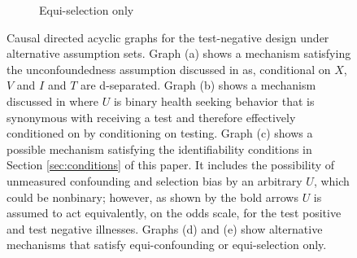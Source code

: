 \documentclass[11pt]{article}
\begin{document}
\begin{figure}[p]
\begin{subfigure}{0.49\linewidth}
        \caption{Equi-selection only}
        \end{subfigure}
        \caption{Causal directed acyclic graphs for the test-negative design under alternative assumption sets. Graph (a) shows a mechanism satisfying the unconfoundedness assumption discussed in \cite{schnitzer_estimands_2022} as, conditional on $X$, $V$ and $I$ and $T$ are d-separated. Graph (b) shows a mechanism discussed in \cite{sullivan_theoretical_2016} where $U$ is binary health seeking behavior that is synonymous with receiving a test and therefore effectively conditioned on by conditioning on testing. Graph (c) shows a possible mechanism satisfying the identifiability conditions in Section \ref{sec:conditions} of this paper. It includes the possibility of unmeasured confounding and selection bias by an arbitrary $U$, which could be nonbinary; however, as shown by the bold arrows $U$ is assumed to act equivalently, on the odds scale, for the test positive and test negative illnesses. Graphs (d) and (e) show alternative mechanisms that satisfy equi-confounding or equi-selection only.}\label{fig:dags}
    \end{figure}
\end{document}
